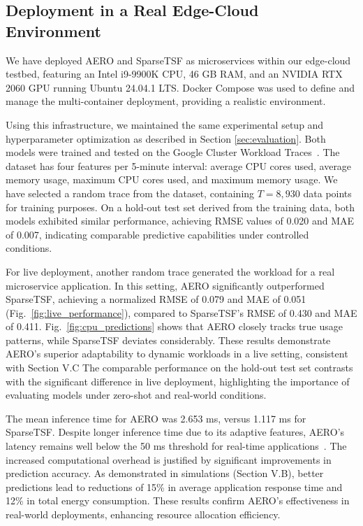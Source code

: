 \documentclass{ieeetmlcn}
\begin{document}
\subsection{Deployment in a Real Edge-Cloud Environment}
\label{sec:live_deployment}

{\color{blue}
We have deployed AERO and SparseTSF as microservices within our edge-cloud testbed, featuring an Intel i9-9900K CPU, 46 GB RAM, and an NVIDIA RTX 2060 GPU running Ubuntu 24.04.1 LTS. Docker Compose was used to define and manage the multi-container deployment, providing a realistic environment.

Using this infrastructure, we maintained the same experimental setup and hyperparameter optimization as described in Section \ref{sec:evaluation}. Both models were trained and tested on the Google Cluster Workload Traces~\cite{GoogleTrace}. The dataset has four features per 5-minute interval: average CPU cores used, average memory usage, maximum CPU cores used, and maximum memory usage. We have selected a random trace from the dataset, containing $T = 8,\!930$ data points for training purposes. On a hold-out test set derived from the training data, both models exhibited similar performance, achieving RMSE values of 0.020 and MAE of 0.007, indicating comparable predictive capabilities under controlled conditions.

For live deployment, another random trace generated the workload for a real microservice application. In this setting, AERO significantly outperformed SparseTSF, achieving a normalized RMSE of 0.079 and MAE of 0.051 (Fig.~\ref{fig:live_performance}), compared to SparseTSF's RMSE of 0.430 and MAE of 0.411. Fig.~\ref{fig:cpu_predictions} shows that AERO closely tracks true usage patterns, while SparseTSF deviates considerably. These results demonstrate AERO's superior adaptability to dynamic workloads in a live setting, consistent with Section V.C The comparable performance on the hold-out test set contrasts with the significant difference in live deployment, highlighting the importance of evaluating models under zero-shot and real-world conditions.

The mean inference time for AERO was 2.653 ms, versus 1.117 ms for SparseTSF. Despite longer inference time due to its adaptive features, AERO's latency remains well below the 50 ms threshold for real-time applications~\cite{50mslatency}. The increased computational overhead is justified by significant improvements in prediction accuracy. As demonstrated in simulations (Section V.B), better predictions lead to reductions of 15\% in average application response time and 12\% in total energy consumption. These results confirm AERO's effectiveness in real-world deployments, enhancing resource allocation efficiency.
}
\end{document}
